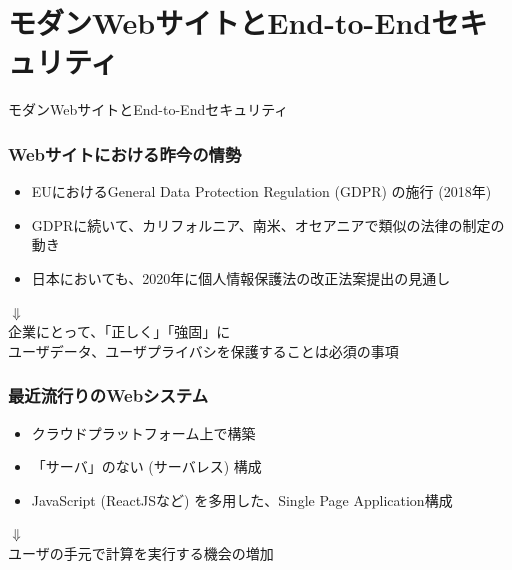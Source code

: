 \documentclass[12pt,dvipdfmx]{beamer}
\begin{document}
\section{モダンWebサイトとEnd-to-Endセキュリティ}
\begin{frame}
 \centering
 {\Large モダンWebサイトとEnd-to-Endセキュリティ}
\end{frame}

\begin{frame}
\frametitle{Webサイトにおける昨今の情勢}
\begin{itemize}
\item EUにおけるGeneral Data Protection Regulation (GDPR) の施行 (2018年)\\
\item GDPRに続いて、カリフォルニア、南米、オセアニアで類似の法律の制定の動き\\
\item 日本においても、2020年に個人情報保護法の改正法案提出の見通し
\end{itemize}
\begin{center}
$\Downarrow$\\
\alert{企業にとって、「正しく」「強固」に\\
ユーザデータ、ユーザプライバシを保護することは必須の事項}
\end{center}
\end{frame}

\begin{frame}
\frametitle{最近流行りのWebシステム}
\begin{itemize}
 \item クラウドプラットフォーム上で構築
 \item 「サーバ」のない (\alert{サーバレス}) 構成
 \item JavaScript (ReactJSなど) を多用した、Single Page Application構成
\end{itemize}
\begin{center}
$\Downarrow$\\
\alert{ユーザの手元で計算を実行する機会の増加}
\end{center}
\end{frame}
\end{document}
